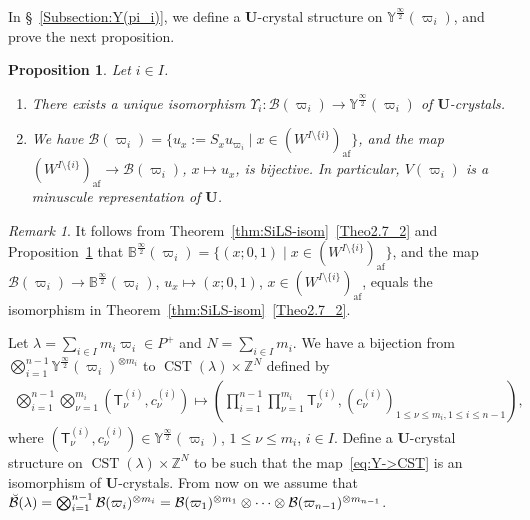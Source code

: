 \documentclass[10pt]{amsart}
\newtheorem{prop}[theo]{Proposition}
\theoremstyle{definition}\newtheorem{defi}[theo]{Definition}
\theoremstyle{remark}\newtheorem{rema}[theo]{Remark}
\newcommand{\BZ}{\mathbb{Z}}
\newcommand{\U}{\mathbf{U}}
\newcommand{\si}{\frac{\infty}{2}}
\DeclareMathOperator{\af}{af}
\DeclareMathOperator{\CST}{CST}
\begin{document}
In \S~\ref{Subsection:Y(pi_i)}, 
we define a $\U$-crystal structure on 
$\mathbb{Y}^{\si}(\varpi_i)$, 
and prove the next proposition. 

\begin{prop} \label{prop:aff-varpi_i}
Let $i \in I$.
\begin{enumerate}[label=(\arabic*)]
\item\label{Prop4.3_1}
There exists a unique isomorphism
$\Upsilon_i : \mathcal{B}(\varpi_i) \rightarrow \mathbb{Y}^{\si}(\varpi_i)$
of $\U$-crystals. 
\item\label{Prop4.3_2}
We have 
$\mathcal{B}(\varpi_i) = \{ u_x := S_x u_{\varpi_i} \mid x \in (W^{I \setminus \{ i \}})_{\af} \}$, 
and the map 
$(W^{I \setminus \{ i \}})_{\af} \rightarrow \mathcal{B}(\varpi_i)$, $x \mapsto u_x$, 
is bijective. In particular, 
$V(\varpi_i)$ 
is a minuscule representation of $\U$. 
\end{enumerate}
\end{prop}

\begin{rema} \label{rem:aff-varpi_i}
It follows from Theorem~\ref{thm:SiLS-isom}~\ref{Theo2.7_2} and Proposition~\ref{prop:aff-varpi_i} that 
$\mathbb{B}^{\si}(\varpi_i) = \{ (x ; 0,1) \mid x \in (W^{I \setminus \{ i \}})_{\af} \}$, 
and the map 
$\mathcal{B}(\varpi_i) \rightarrow \mathbb{B}^{\si}(\varpi_i)$, 
$u_x \mapsto (x;0,1)$, 
$x \in (W^{I \setminus \{ i \}})_{\af}$, 
equals the isomorphism in Theorem~\ref{thm:SiLS-isom}~\ref{Theo2.7_2}.
\end{rema}

Let 
$\lambda = \sum_{i \in I} m_i \varpi_i \in P^+$
and 
$N = \sum_{i \in I} m_i$. 
We have a bijection from 
$\bigotimes_{i=1}^{n-1} \mathbb{Y}^{\si}(\varpi_i)^{\otimes m_i}$
to
$\CST (\lambda) \times \BZ^N$
defined by
\begin{align} \label{eq:Y->CST}
\bigotimes_{i=1}^{n-1} \bigotimes_{\nu = 1}^{m_i} 
\left( \mathsf{T}_{\nu}^{(i)} , c_{\nu}^{(i)} \right)
\longmapsto 
\left(
\prod_{i=1}^{n-1} \prod_{\nu = 1}^{m_i}
\mathsf{T}_{\nu}^{(i)} , 
(c_{\nu}^{(i)})_{1 \leq \nu \leq m_i , 1 \leq i \leq n-1}
\right) ,
\end{align}
where 
$(\mathsf{T}_{\nu}^{(i)} , c_{\nu}^{(i)}) \in \mathbb{Y}^{\si}(\varpi_i)$, 
$1 \leq \nu \leq m_i$, $i \in I$. 
Define a $\U$-crystal structure on 
$\CST (\lambda) \times \BZ^N$ 
to be such that the map~\eqref{eq:Y->CST} is an isomorphism of $\U$-crystals. 
From now on we assume that 
$\Breve{\mathcal{B}}(\lambda) 
=
\bigotimes_{i=1}^{n-1} \mathcal{B}(\varpi_i)^{\otimes m_i}
=
\mathcal{B}(\varpi_1)^{\otimes m_1} \otimes \cdots \otimes \mathcal{B}(\varpi_{n-1})^{\otimes m_{n-1}}$.
\end{document}
